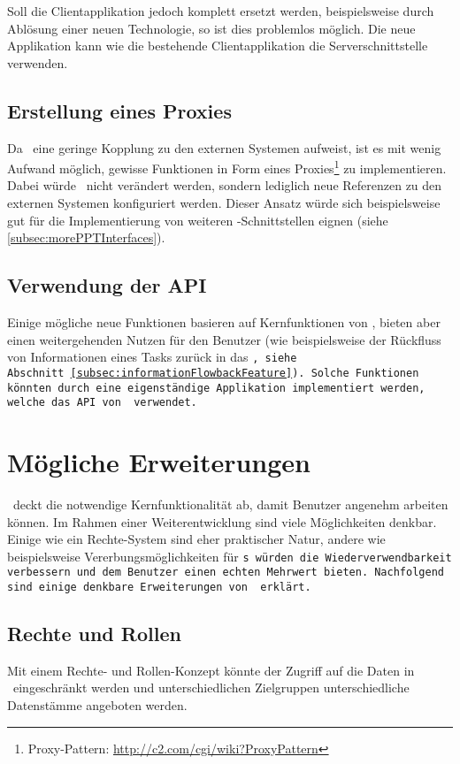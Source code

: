 			Soll die Clientapplikation jedoch komplett ersetzt werden, beispielsweise durch Ablösung einer neuen Technologie, so ist dies problemlos möglich.
			Die neue Applikation kann wie die bestehende Clientapplikation die Serverschnittstelle verwenden.
			

		\subsection{Erstellung eines Proxies}
			Da \eeppi\ eine geringe Kopplung zu den externen Systemen aufweist,
			 ist es mit wenig Aufwand möglich,
			gewisse Funktionen in Form eines Proxies\footnote{Proxy-Pattern: \url{http://c2.com/cgi/wiki?ProxyPattern}} zu implementieren.
			Dabei würde \eeppi\ nicht verändert werden,
			sondern lediglich neue Referenzen zu den externen Systemen konfiguriert werden.
			Dieser Ansatz würde sich beispielsweise gut für die Implementierung von weiteren \ppt-Schnittstellen eignen (siehe \ref{subsec:morePPTInterfaces}).
			
		\subsection{Verwendung der API}
			Einige mögliche neue Funktionen basieren auf Kernfunktionen von \eeppi,
			bieten aber einen weitergehenden Nutzen für den Benutzer
			(wie beispielsweise der Rückfluss von Informationen eines Tasks zurück in das \tt, siehe Abschnitt~\ref{subsec:informationFlowbackFeature}).
			Solche Funktionen könnten durch eine eigenständige Applikation implementiert werden,
			welche das API von \eeppi\ verwendet.


	\section{Mögliche Erweiterungen}
	\label{sec:possibleExtensions}
		\eeppi\ deckt die notwendige Kernfunktionalität ab, damit Benutzer angenehm arbeiten können.
		Im Rahmen einer Weiterentwicklung sind viele Möglichkeiten denkbar. 
		Einige wie ein Rechte-System sind eher praktischer Natur, 
		andere wie beispielsweise Vererbungsmöglichkeiten für \tt s würden die Wiederverwendbarkeit verbessern und dem Benutzer einen echten Mehrwert bieten.
		Nachfolgend sind einige denkbare Erweiterungen von \eeppi\ erklärt.
		
		\subsection{Rechte und Rollen}
			Mit einem Rechte- und Rollen-Konzept könnte der Zugriff auf die Daten in \eeppi\ eingeschränkt werden
			und unterschiedlichen Zielgruppen unterschiedliche Datenstämme angeboten werden.
			
